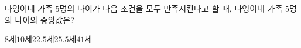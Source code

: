 다영이네 가족 $5$명의 나이가 다음 조건을 모두 만족시킨다고 할 때, 다영이네 가족 $5$명의 나이의 중앙값은?
\begin{choices32}{$8$세}{$10$세}{$22.5$세}{$25.5$세}{$41$세}\end{choices32}
